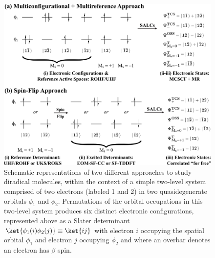 \documentclass[aip,jcp,preprint,superscriptaddress,floatfix]{revtex4-1}
\begin{document}
\begin{figure}[h!tp]
\includegraphics[width=\textwidth]{includes/MRvsSF-2level.pdf}
\caption[Quantum chemistry on two-level systems]{Schematic
representations of two different approaches to study diradical molecules,
within the context of a simple two-level system comprised of two electrons
(labeled 1 and 2) in two quasidegenerate orbitals $\phi_1$ and $\phi_2$.
Permutations of the orbital occupations in this two-level system produces six
distinct electronic configurations, represented above as a Slater determinant
$\ket{\phi_1(i)\phi_2(j)}\equiv\ket{ij}$ with electron $i$ occupying the
spatial orbital $\phi_1$ and electron $j$ occupying $\phi_2$ and where an
overbar denotes an electron has $\beta$ spin.}
\label{fig:2level}
\end{figure}
\end{document}
